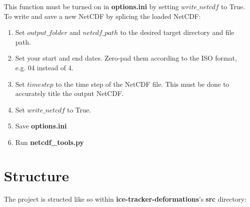 \documentclass{article}
\begin{document}
\begin{itemize}
            This function must be turned on in \textbf{options.ini} by setting $write\_netcdf$ to True. To write and save a new NetCDF by splicing the loaded NetCDF:
            \begin{enumerate}
                \item Set $output\_folder$ and $netcdf\_path$ to the desired target directory and file path.
                \item Set your start and end dates. Zero-pad them according to the ISO format, e.g. 04 instead of 4.
                \item Set $timestep$ to the time step of the NetCDF file. This must be done to accurately title the output NetCDF.
                \item Set $write\_netcdf$ to True.
                \item Save \textbf{options.ini}
                \item Run \textbf{netcdf\_tools.py}
            \end{enumerate}
        \end{itemize}

\section{Structure}
\label{Structure}

    The project is structed like so within \textbf{ice-tracker-deformations}'s \textbf{src} directory:
    \begin{figure}[H]
        \centering
        \begin{minipage}[b]{.5\textwidth}
        \end{minipage}%
        \begin{minipage}{.5\textwidth}
        \end{minipage}
    \end{figure}
\end{document}
